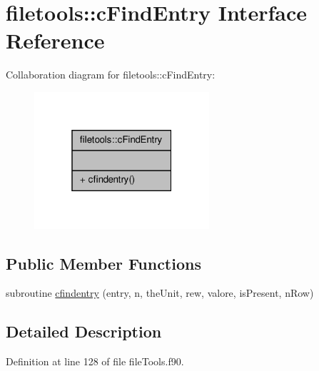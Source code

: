 \hypertarget{interfacefiletools_1_1c_find_entry}{\section{filetools\-:\-:c\-Find\-Entry Interface Reference}
\label{interfacefiletools_1_1c_find_entry}
}


Collaboration diagram for filetools\-:\-:c\-Find\-Entry\-:\nopagebreak
\begin{figure}[H]
\begin{center}
\leavevmode
\includegraphics[width=184pt]{interfacefiletools_1_1c_find_entry__coll__graph}
\end{center}
\end{figure}
\subsection*{Public Member Functions}
\begin{DoxyCompactItemize}
\item 
subroutine \hyperlink{interfacefiletools_1_1c_find_entry_af8f083dc5d82069ac9c02e3ae98e30bf}{cfindentry} (entry, n, the\-Unit, rew, valore, is\-Present, n\-Row)
\end{DoxyCompactItemize}


\subsection{Detailed Description}


Definition at line 128 of file file\-Tools.\-f90.



